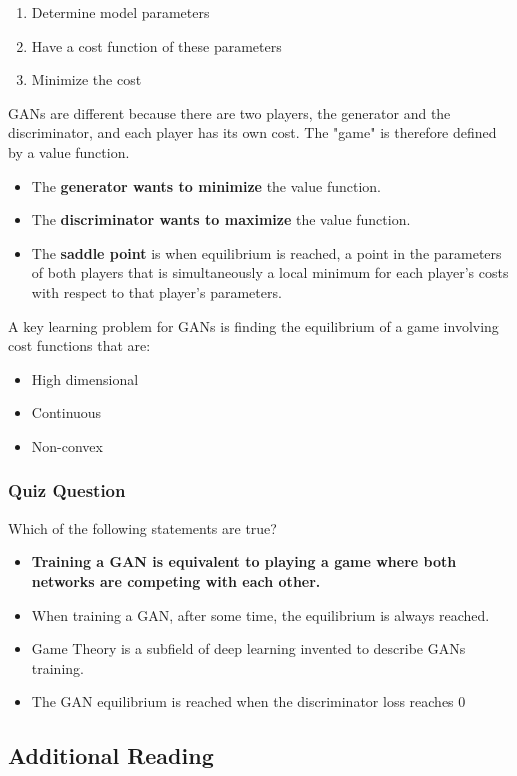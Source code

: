 \begin{enumerate}
    \item Determine model parameters
    \item Have a cost function of these parameters
    \item Minimize the cost
\end{enumerate}
GANs are different because there are two players, the generator and the discriminator, and each player has its own cost. The "game" is therefore defined by a value function.

\begin{itemize}
    \item The \textbf{generator wants to minimize} the value function.
    \item The \textbf{discriminator wants to maximize} the value function.
    \item The \textbf{saddle point} is when equilibrium is reached, a point in the parameters of both players that is simultaneously a local minimum for each player's costs with respect to that player's parameters.
\end{itemize}
A key learning problem for GANs is finding the equilibrium of a game involving cost functions that are:

\begin{itemize}
    \item High dimensional
    \item Continuous
    \item Non-convex
\end{itemize}

\subsubsection{Quiz Question}
Which of the following statements are true?
\begin{itemize}
    \item \textbf{Training a GAN is equivalent to playing a game where both networks are competing with each other.}
    \item When training a GAN, after some time, the equilibrium is always reached.
    \item Game Theory is a subfield of deep learning invented to describe GANs training.
    \item The GAN equilibrium is reached when the discriminator loss reaches 0
\end{itemize}


\subsection{Additional Reading}

